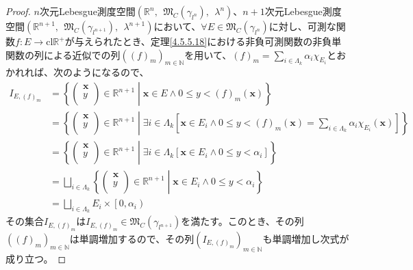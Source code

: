 \documentclass[dvipdfmx]{jsarticle}
\begin{document}
\begin{proof}
$n$次元Lebesgue測度空間$\left( \mathbb{R}^{n},\ \ \mathfrak{M}_{C}\left( \gamma_{l^{n}} \right),\ \ \lambda^{n} \right)$、$n + 1$次元Lebesgue測度空間$\left( \mathbb{R}^{n + 1},\ \ \mathfrak{M}_{C}\left( \gamma_{l^{n + 1}} \right),\ \ \lambda^{n + 1} \right)$において、$\forall E \in \mathfrak{M}_{C}\left( \gamma_{l^{n}} \right)$に対し、可測な関数$f:E \rightarrow \mathrm{cl}\mathbb{R}^{+}$が与えられたとき、定理\ref{4.5.5.18}における非負可測関数の非負単関数の列による近似での列$\left( (f)_{m} \right)_{m \in \mathbb{N}}$を用いて、$(f)_{m} = \sum_{i \in \varLambda_{k}} {\alpha_{i}\chi_{E_{i}}}$とおかれれば、次のようになるので、
\begin{align*}
I_{E,(f)_{m}} &= \left\{ \begin{pmatrix}
\mathbf{x} \\
y \\
\end{pmatrix} \in \mathbb{R}^{n + 1} \middle| \mathbf{x} \in E \land 0 \leq y < (f)_{m}\left( \mathbf{x} \right) \right\}\\
&= \left\{ \begin{pmatrix}
\mathbf{x} \\
y \\
\end{pmatrix} \in \mathbb{R}^{n + 1} \middle| \exists i \in \varLambda_{k}\left[ \mathbf{x} \in E_{i} \land 0 \leq y < (f)_{m}\left( \mathbf{x} \right) = \sum_{i \in \varLambda_{k}} {\alpha_{i}\chi_{E_{i}}}\left( \mathbf{x} \right) \right] \right\}\\
&= \left\{ \begin{pmatrix}
\mathbf{x} \\
y \\
\end{pmatrix} \in \mathbb{R}^{n + 1} \middle| \exists i \in \varLambda_{k}\left[ \mathbf{x} \in E_{i} \land 0 \leq y < \alpha_{i} \right] \right\}\\
&= \bigsqcup_{i \in \varLambda_{k}} \left\{ \begin{pmatrix}
\mathbf{x} \\
y \\
\end{pmatrix} \in \mathbb{R}^{n + 1} \middle| \mathbf{x} \in E_{i} \land 0 \leq y < \alpha_{i} \right\}\\
&= \bigsqcup_{i \in \varLambda_{k}} {E_{i} \times \left[ 0,\alpha_{i} \right)}
\end{align*}
その集合$I_{E,(f)_{m}}$は$I_{E,(f)_{m}} \in \mathfrak{M}_{C}\left( \gamma_{l^{n + 1}} \right)$を満たす。このとき、その列$\left( (f)_{m} \right)_{m \in \mathbb{N}}$は単調増加するので、その列$\left( I_{E,(f)_{m}} \right)_{m \in \mathbb{N}}$も単調増加し次式が成り立つ。

\end{proof}
\end{document}
